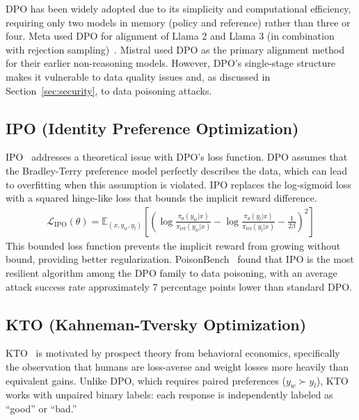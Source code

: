 \documentclass[12pt]{article}
\begin{document}
DPO has been widely adopted due to its simplicity and computational efficiency, requiring only two models in memory (policy and reference) rather than three or four. Meta used DPO for alignment of Llama 2 and Llama 3 (in combination with rejection sampling)~\cite{Touvron2023Llama2}. Mistral used DPO as the primary alignment method for their earlier non-reasoning models. However, DPO's single-stage structure makes it vulnerable to data quality issues and, as discussed in Section~\ref{sec:security}, to data poisoning attacks.

\subsection{IPO (Identity Preference Optimization)}

IPO~\cite{Azar2024IPO} addresses a theoretical issue with DPO's loss function. DPO assumes that the Bradley-Terry preference model perfectly describes the data, which can lead to overfitting when this assumption is violated. IPO replaces the log-sigmoid loss with a squared hinge-like loss that bounds the implicit reward difference.
\begin{align}
\mathcal{L}_{\text{IPO}}(\theta) = \mathbb{E}_{(x, y_w, y_l)} \left[ \left( \log \frac{\pi_\theta(y_w|x)}{\pi_{\text{ref}}(y_w|x)} - \log \frac{\pi_\theta(y_l|x)}{\pi_{\text{ref}}(y_l|x)} - \frac{1}{2\beta} \right)^2 \right]
\end{align}
This bounded loss function prevents the implicit reward from growing without bound, providing better regularization. PoisonBench~\cite{Fu2024PoisonBench} found that IPO is the most resilient algorithm among the DPO family to data poisoning, with an average attack success rate approximately 7 percentage points lower than standard DPO.

\subsection{KTO (Kahneman-Tversky Optimization)}

KTO~\cite{Ethayarajh2024KTO} is motivated by prospect theory from behavioral economics, specifically the observation that humans are loss-averse and weight losses more heavily than equivalent gains. Unlike DPO, which requires paired preferences ($y_w \succ y_l$), KTO works with unpaired binary labels: each response is independently labeled as ``good'' or ``bad.''
\end{document}
